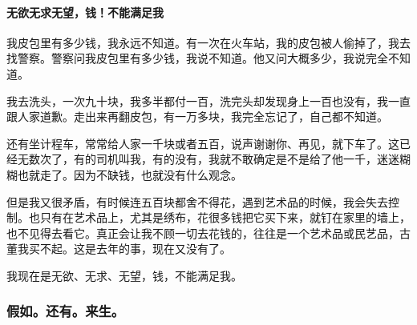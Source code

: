 \paragraph*{无欲无求无望，钱！不能满足我}
\par 我皮包里有多少钱，我永远不知道。有一次在火车站，我的皮包被人偷掉了，我去找警察。警察问我皮包里有多少钱，我说不知道。他又问大概多少，我说完全不知道。
\par 我去洗头，一次九十块，我多半都付一百，洗完头却发现身上一百也没有，我一直跟人家道歉。走出来再翻皮包，有一万多块，我完全忘记了，自己都不知道。
\par 还有坐计程车，常常给人家一千块或者五百，说声谢谢你、再见，就下车了。这已经无数次了，有的司机叫我，有的没有，我就不敢确定是不是给了他一千，迷迷糊糊也就走了。因为不缺钱，也就没有什么观念。
\par 但是我又很矛盾，有时候连五百块都舍不得花，遇到艺术品的时候，我会失去控制。也只有在艺术品上，尤其是绣布，花很多钱把它买下来，就钉在家里的墙上，也不见得去看它。真正会让我不顾一切去花钱的，往往是一个艺术品或民艺品，古董我买不起。这是去年的事，现在又没有了。
\par 我现在是无欲、无求、无望，钱，不能满足我。
\par {}















\subsubsection{假如。还有。来生。}




